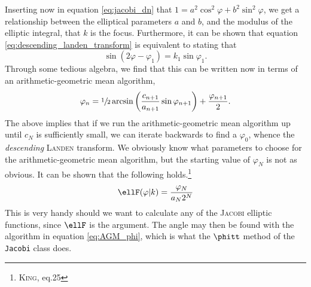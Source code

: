 Inserting now in equation \eqref{eq:jacobi_dn} that $1 = a^2 \cos^2{\varphi} + b^2 \sin^2{\varphi}$, we get a relationship between the elliptical parameters $a$ and $b$, and the modulus of the elliptic integral, that $k$ is the focus.
Furthermore, it can be shown that equation \eqref{eq:descending_landen_transform} is equivalent to stating that
\[
\sin{( 2\varphi - \varphi_1 )} = k_1 \sin{\varphi_1}.
\]
Through some tedious algebra, we find that this can be written now in terms of an arithmetic-geometric mean algorithm,
\begin{equation}\label{eq:AGM_phi}
\varphi_n = \sfrac{1}{2} \arcsin{\left( \frac{c_{n+1}}{a_{n+1}} \sin{\varphi_{n+1}} \right)} + \frac{\varphi_{n+1}}{2}.
\end{equation}
The above implies that if we run the arithmetic-geometric mean algorithm up until $c_N$ is sufficiently small, we can iterate backwards to find a $\varphi_0$, whence the \emph{descending} \textsc{Landen} transform.
We obviously know what parameters to choose for the arithmetic-geometric mean algorithm, but the starting value of $\varphi_N$ is not as obvious.
It can be shown that the following holds.\footnote{\cite{king1924direct} \textsc{King}, eq.25}
\begin{equation}\label{eq:AGM_ellF}
\ellF(\varphi \vert k) = \frac{\varphi_N}{a_N 2^N}
\end{equation}
This is very handy should we want to calculate any of the \textsc{Jacobi} elliptic functions, since $\ellF$ is the argument.
The angle may then be found with the algorithm in equation \eqref{eq:AGM_phi}, which is what the $\phitt$ method of the \texttt{Jacobi} class does.

